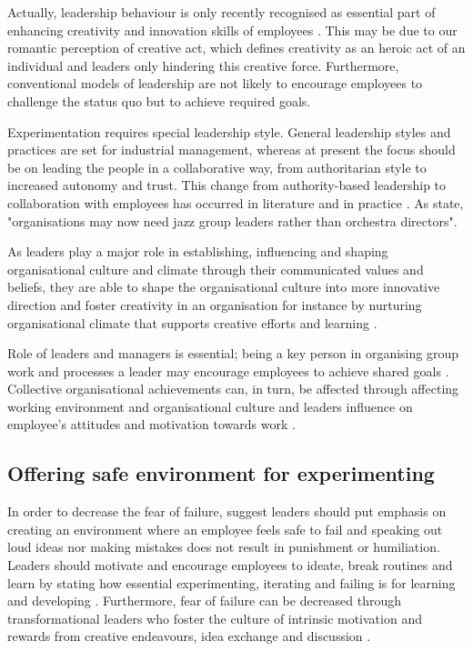 Actually, leadership behaviour is only recently recognised as essential part of enhancing creativity and innovation skills of employees \citep{mumford2002leading}. This may be due to our romantic perception of creative act, which defines creativity as an heroic act of an individual and leaders only hindering this creative force. Furthermore, conventional models of leadership are not likely to encourage employees to challenge the status quo but to achieve required goals.\citep{mumford2002leading} 

Experimentation requires special leadership style. General leadership styles and practices are set for industrial management, whereas at present the focus should be on leading the people in a collaborative way, from authoritarian style to increased autonomy and trust. This change from authority-based leadership to collaboration with employees has occurred in literature and in practice \citep{amabile2008creativity,farson2002failuretolerantleader}. As \citet{mumford2002leading} state, "organisations may now need jazz group leaders rather than orchestra directors". 

As leaders play a major role in establishing, influencing and shaping organisational culture and climate through their communicated values and beliefs, they are able to shape the organisational culture into more innovative direction and foster creativity in an organisation \citep{jung2003role,schein2010organizational} for instance by nurturing organisational climate that supports creative efforts and learning \citep{yukl2002leadership}. 

Role of leaders and managers is essential; being a key person in organising group work and processes a leader may encourage employees to achieve shared goals \citep{amabile1998kill}. Collective organisational achievements can, in turn, be affected through affecting working environment and organisational culture and leaders influence on employee's attitudes and motivation towards work \citep{amabile1998kill}.

\subsection{Offering safe environment for experimenting}
In order to decrease the fear of failure, \citet{amabile2008creativity} suggest leaders should put emphasis on creating an environment where an employee feels safe to fail and speaking out loud ideas nor making mistakes does not result in punishment or humiliation. Leaders should motivate and encourage employees to ideate, break routines and learn by stating how essential experimenting, iterating and failing is for learning and developing \citep{amabile2008creativity,shalley2004leaders}. Furthermore, fear of failure can be decreased through transformational leaders who foster the culture of intrinsic motivation and rewards from creative endeavours, idea exchange and discussion \citep{amabile1998kill}. 

